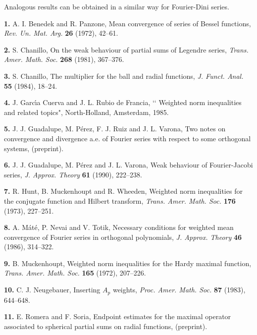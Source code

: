 Analogous results can be obtained in a similar way for Fourier-Dini series.
\bigskip
{}\par\nobreak
\medskip
\item {{\bf 1.}} A. I. Benedek and R. Panzone, Mean convergence of series of
Bessel functions, {\it Rev. Un. Mat. Arg.} {\bf 26} (1972), 42--61.

\item {{\bf 2.}} S. Chanillo, On the weak behaviour of partial sums of
Legendre series, {\it Trans. Amer. Math. Soc.} {\bf 268} (1981), 367--376.

\item {{\bf 3.}} S. Chanillo, The multiplier for the ball and radial
functions, {\it J. Funct. Anal.} {\bf 55} (1984), 18--24.

\item {{\bf 4.}} J. Garc\'\i a Cuerva and J. L. Rubio de Francia, \lq \lq
Weighted norm inequalities and related topics", North-Holland, Amsterdam, 1985.

\item {{\bf 5.}} J. J. Guadalupe, M. P\'erez, F. J. Ruiz and J. L. Varona,
Two notes on convergence and divergence a.e. of Fourier series with
respect to some orthogonal systems, (preprint).

\item {{\bf 6.}} J. J. Guadalupe, M. P\'erez and J. L. Varona, Weak behaviour of
Fourier-Jacobi series, {\it J. Approx. Theory} {\bf 61} (1990), 222--238.

\item {{\bf 7.}} R. Hunt, B. Muckenhoupt and R. Wheeden, Weighted norm
inequalities for the conjugate function and Hilbert transform, {\it Trans. Amer.
Math. Soc.} {\bf 176} (1973), 227--251.

\item {{\bf 8.}} A. M\'at\'e, P. Nevai and V. Totik, Necessary
conditions for weighted mean convergence of Fourier series in orthogonal
polynomials, {\it J. Approx. Theory} {\bf 46} (1986), 314--322.

\item {{\bf 9.}} B. Muckenhoupt, Weighted norm inequalities for the
Hardy maximal function, {\it Trans. Amer. Math. Soc.} {\bf 165} (1972), 207--226.

\item {{\bf 10.}} C. J. Neugebauer, Inserting $A_p$ weights, {\it Proc. Amer.
Math. Soc.} {\bf 87} (1983), 644--648.

\item {{\bf 11.}} E. Romera and F. Soria, Endpoint estimates for the
maximal operator associated to spherical partial sums on radial functions,
(preprint).

